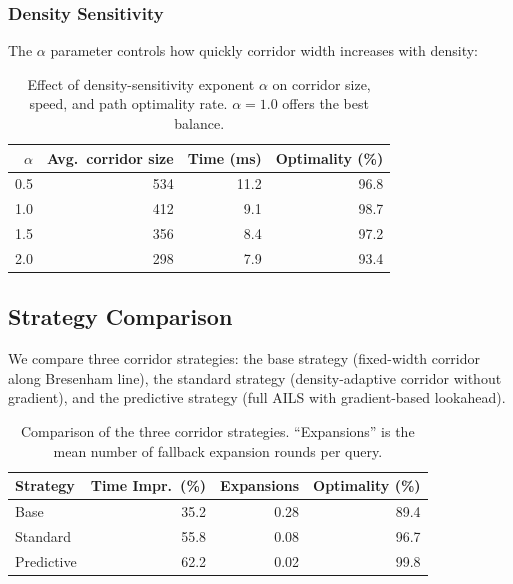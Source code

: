 \documentclass[journal]{IEEEtran}
\begin{document}
\subsubsection{Density Sensitivity}
The $\alpha$ parameter controls how quickly corridor width increases with density:

\begin{table}[h]
\centering
\caption{Effect of density-sensitivity exponent $\alpha$ on corridor size, speed, and path optimality rate. $\alpha{=}1.0$ offers the best balance.}
\label{tab:ablation_alpha}
\footnotesize
\begin{tabular}{rrrr}
\toprule
$\alpha$ & Avg.\ corridor size & Time (ms) & Optimality (\%) \\
\midrule
0.5 & 534 & 11.2 & 96.8 \\
1.0 & 412 & 9.1  & 98.7 \\
1.5 & 356 & 8.4  & 97.2 \\
2.0 & 298 & 7.9  & 93.4 \\
\bottomrule
\end{tabular}
\normalsize
\end{table}

\subsection{Strategy Comparison}

We compare three corridor strategies: the base strategy (fixed-width corridor along Bresenham line), the standard strategy (density-adaptive corridor without gradient), and the predictive strategy (full AILS with gradient-based lookahead).

\begin{table}[h]
\centering
\caption{Comparison of the three corridor strategies. ``Expansions'' is the mean number of fallback expansion rounds per query.}
\label{tab:strategy_comparison}
\footnotesize
\begin{tabular}{lrrr}
\toprule
Strategy & Time Impr.\ (\%) & Expansions & Optimality (\%) \\
\midrule
Base       & 35.2 & 0.28 & 89.4 \\
Standard   & 55.8 & 0.08 & 96.7 \\
Predictive & 62.2 & 0.02 & 99.8 \\
\bottomrule
\end{tabular}
\normalsize
\end{table}

\end{document}
